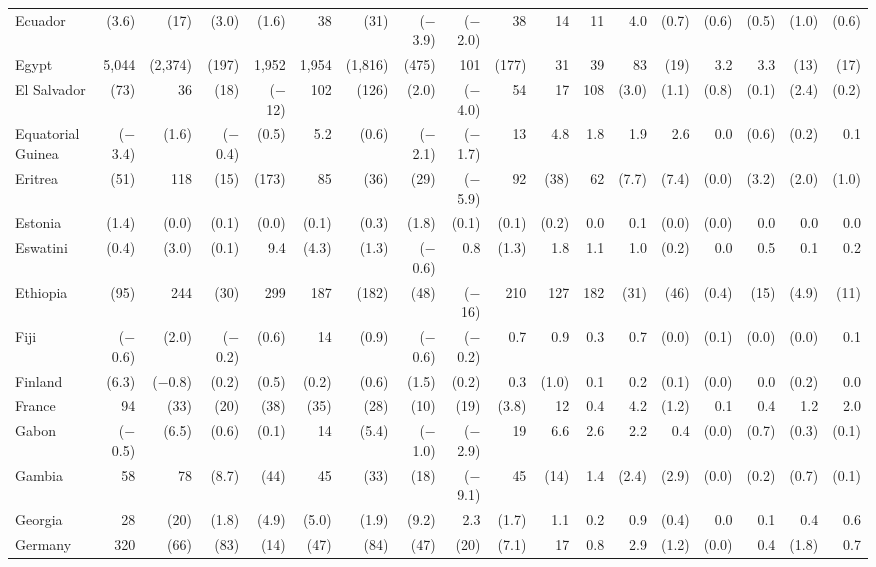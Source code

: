 \begin{longtable}{lrrrrrrrrrrrrrrrrr}
Ecuador & (3.6) & (17) & (3.0) & (1.6) & 38 & (31) & ($-$3.9) & ($-$2.0) & 38 & 14 & 11 & 4.0 & (0.7) & (0.6) & (0.5) & (1.0) & (0.6) \\
Egypt & 5,044 & (2,374) & (197) & 1,952 & 1,954 & (1,816) & (475) & 101 & (177) & 31 & 39 & 83 & (19) & 3.2 & 3.3 & (13) & (17) \\
El Salvador & (73) & 36 & (18) & ($-$12) & 102 & (126) & (2.0) & ($-$4.0) & 54 & 17 & 108 & (3.0) & (1.1) & (0.8) & (0.1) & (2.4) & (0.2) \\
Equatorial Guinea & ($-$3.4) & (1.6) & ($-$0.4) & (0.5) & 5.2 & (0.6) & ($-$2.1) & ($-$1.7) & 13 & 4.8 & 1.8 & 1.9 & 2.6 & 0.0 & (0.6) & (0.2) & 0.1 \\
Eritrea & (51) & 118 & (15) & (173) & 85 & (36) & (29) & ($-$5.9) & 92 & (38) & 62 & (7.7) & (7.4) & (0.0) & (3.2) & (2.0) & (1.0) \\
Estonia & (1.4) & (0.0) & (0.1) & (0.0) & (0.1) & (0.3) & (1.8) & (0.1) & (0.1) & (0.2) & 0.0 & 0.1 & (0.0) & (0.0) & 0.0 & 0.0 & 0.0 \\
Eswatini & (0.4) & (3.0) & (0.1) & 9.4 & (4.3) & (1.3) & ($-$0.6) & 0.8 & (1.3) & 1.8 & 1.1 & 1.0 & (0.2) & 0.0 & 0.5 & 0.1 & 0.2 \\
Ethiopia & (95) & 244 & (30) & 299 & 187 & (182) & (48) & ($-$16) & 210 & 127 & 182 & (31) & (46) & (0.4) & (15) & (4.9) & (11) \\
Fiji & ($-$0.6) & (2.0) & ($-$0.2) & (0.6) & 14 & (0.9) & ($-$0.6) & ($-$0.2) & 0.7 & 0.9 & 0.3 & 0.7 & (0.0) & (0.1) & (0.0) & (0.0) & 0.1 \\
Finland & (6.3) & ($-$0.8) & (0.2) & (0.5) & (0.2) & (0.6) & (1.5) & (0.2) & 0.3 & (1.0) & 0.1 & 0.2 & (0.1) & (0.0) & 0.0 & (0.2) & 0.0 \\
France & 94 & (33) & (20) & (38) & (35) & (28) & (10) & (19) & (3.8) & 12 & 0.4 & 4.2 & (1.2) & 0.1 & 0.4 & 1.2 & 2.0 \\
Gabon & ($-$0.5) & (6.5) & (0.6) & (0.1) & 14 & (5.4) & ($-$1.0) & ($-$2.9) & 19 & 6.6 & 2.6 & 2.2 & 0.4 & (0.0) & (0.7) & (0.3) & (0.1) \\
Gambia & 58 & 78 & (8.7) & (44) & 45 & (33) & (18) & ($-$9.1) & 45 & (14) & 1.4 & (2.4) & (2.9) & (0.0) & (0.2) & (0.7) & (0.1) \\
Georgia & 28 & (20) & (1.8) & (4.9) & (5.0) & (1.9) & (9.2) & 2.3 & (1.7) & 1.1 & 0.2 & 0.9 & (0.4) & 0.0 & 0.1 & 0.4 & 0.6 \\
Germany & 320 & (66) & (83) & (14) & (47) & (84) & (47) & (20) & (7.1) & 17 & 0.8 & 2.9 & (1.2) & (0.0) & 0.4 & (1.8) & 0.7 \\

\end{longtable}

